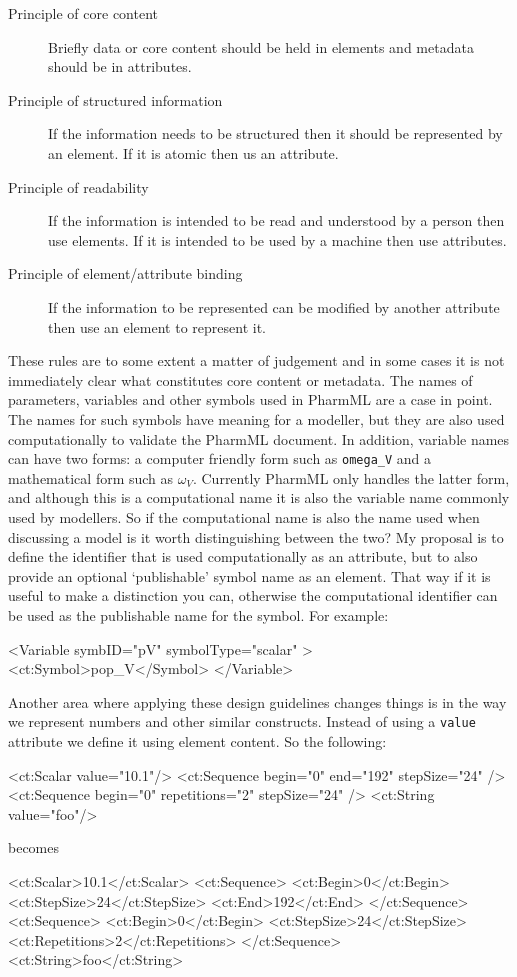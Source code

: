 \documentclass[a4paper,11pt]{article}
\newcommand{\pharmml}{PharmML\xspace}
\newcommand{\xatt}[1]{\texttt{#1}\index{XML Attribute!\texttt{#1}}}
\begin{document}
\begin{description}
\item[Principle of core content] Briefly data or core content should
  be held in elements and metadata should be in attributes.
\item[Principle of structured information] If the information needs to
  be structured then it should be represented by an element. If it is
  atomic then us an attribute.
\item[Principle of readability] If the information is intended to be
  read and understood by a person then use elements. If it is intended
  to be used by a machine then use attributes.
\item[Principle of element/attribute binding] If the information to be
  represented can be modified by another attribute then use an element
  to represent it.
\end{description}

These rules are to some extent a matter of judgement and in some cases
it is not immediately clear what constitutes core content or
metadata. The names of parameters, variables and other symbols used in
\pharmml are a case in point. The names for such symbols have meaning
for a modeller, but they are also used computationally to validate the
\pharmml document. In addition, variable names can have two forms: a
computer friendly form such as \texttt{omega\_V} and a mathematical
form such as $\omega_V$. Currently \pharmml only handles the latter
form, and although this is a computational name it is also the
variable name commonly used by modellers. So if the computational name
is also the name used when discussing a model is it worth
distinguishing between the two? My proposal is to
define the identifier that is used computationally as an attribute,
but to also provide an optional `publishable' symbol name as an element. That way if
it is useful to make a distinction you can, otherwise the
computational identifier can be used as the publishable name for the
symbol. For example:
%
\begin{xmlcode}
<Variable symbID="pV" symbolType="scalar" >
  <ct:Symbol>pop_V</Symbol>
</Variable>
\end{xmlcode}

Another area where applying these design guidelines changes things is
in the way we represent numbers and other similar constructs. Instead
of using a
\xatt{value} attribute we define it using element content. So the
following:
%
\begin{xmlcode}
<ct:Scalar value="10.1"/>
<ct:Sequence begin="0" end="192" stepSize="24" />
<ct:Sequence begin="0" repetitions="2" stepSize="24" />
<ct:String value="foo"/>
\end{xmlcode}
%
becomes
%
\begin{xmlcode}
<ct:Scalar>10.1</ct:Scalar>
<ct:Sequence>
    <ct:Begin>0</ct:Begin>
    <ct:StepSize>24</ct:StepSize>
    <ct:End>192</ct:End>
</ct:Sequence>
<ct:Sequence>
    <ct:Begin>0</ct:Begin>
    <ct:StepSize>24</ct:StepSize>
    <ct:Repetitions>2</ct:Repetitions>
</ct:Sequence>
<ct:String>foo</ct:String>
\end{xmlcode}
\end{document}
